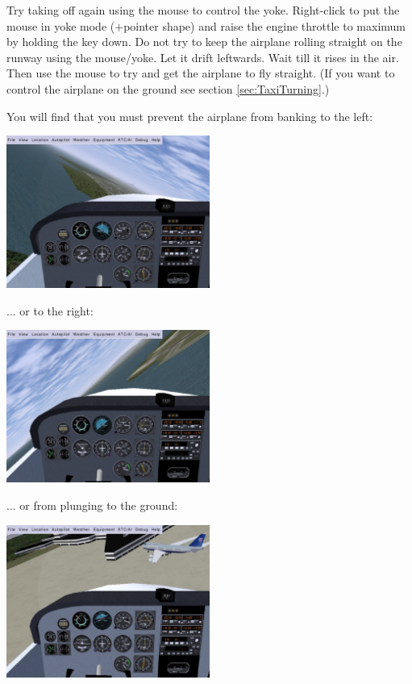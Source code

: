 Try taking off again using the mouse to control the yoke. Right-click to put 
the mouse in yoke mode ($+$pointer shape) and raise the engine throttle to 
maximum by holding the  key down. Do not try to keep the airplane 
rolling straight on the runway using the mouse/yoke. Let it drift leftwards.
Wait till it rises in the air. Then use the mouse to try and get the
airplane to fly straight. (If you want to control the airplane on the
ground see section \ref{sec:TaxiTurning}.)

You will find that you must prevent the airplane from banking to the left:

\begin{center}
\includegraphics[width=0.5\textwidth]{img/tut_11}
\end{center}

... or to the right:


\begin{center}
\includegraphics[width=0.5\textwidth]{img/tut_12}
\end{center}

... or from plunging to the ground:


\begin{center}
\includegraphics[width=0.5\textwidth]{img/tut_13}
\end{center}

